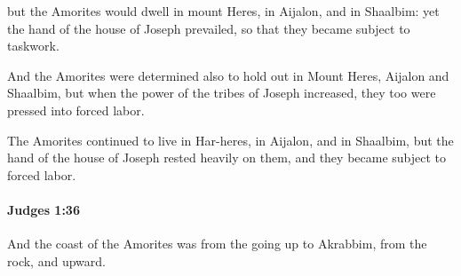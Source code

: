 			\begin{versebox}
					\item[BHS] 
					\item[ASV] but the Amorites would dwell in mount Heres, in Aijalon, and in Shaalbim: yet the hand of the house of Joseph prevailed, so that they became subject to taskwork.
					\item[NIV] And the Amorites were determined also to hold out in Mount Heres, Aijalon and Shaalbim, but when the power of the tribes of Joseph increased, they too were pressed into forced labor.
					\item[NRSV] The Amorites continued to live in Har-heres, in Aijalon, and in Shaalbim, but the hand of the house of Joseph rested heavily on them, and they became subject to forced labor.
			\end{versebox}

		\paragraph{Judges 1:36} %
			\label{JUDGES-1-36}

			And the coast of the Amorites was from the going up to Akrabbim, from the rock, and upward.

